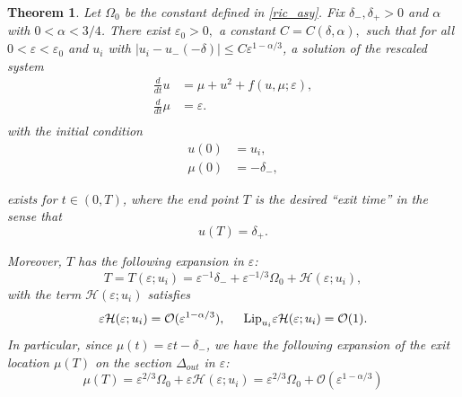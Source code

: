 \documentclass[letterpaper,11pt]{article}
\newcommand{\rmO}{\mathcal{O}}
\newcommand{\eps}{\varepsilon}
\numberwithin{equation}{section}
\theoremstyle{plain}
\newtheorem{theorem}{Theorem}[section]
\begin{document}
\begin{theorem}\label{thm:main}Let $\Omega_0$ be the constant defined in \eqref{ric_asy}.
Fix $\delta_-, \delta_+>0$ and $\alpha$ with $0<\alpha <3/4$. There exist $\eps_0>0,$ a constant $C=C(\delta,\alpha),$ such that for all $0<\eps<\eps_0$ and $u_i$ with $|u_i -u_-(-\delta) | \le C\eps^{1-\alpha/3}$, a solution of the rescaled system 
\begin{equation}\label{main_eqn}
\begin{split}
\frac{d}{dt}u &= \mu+u^2+ f(u,\mu;\eps), \\
\frac{d}{dt} \mu &= \eps.  \\
\end{split}
\end{equation}
with the initial condition
\begin{equation}\label{main_ic}
\begin{split}
u(0) &= u_i, \\
\mu(0) &= -\delta_-,
\end{split}
\end{equation}

exists for $t \in (0,T)$, where the end point $T$ is the desired ``exit time'' in the sense that 
\begin{equation}\label{exit_time_cond}
 u(T) = \delta_+.
\end{equation}

Moreover, $T$ has the following expansion in $\eps$:
\begin{equation}\label{T_exp_+}
T = T(\eps ; u_i) = \eps^{-1}\delta_- + \eps^{-1/3}\Omega_0 +  \mathcal{H}(\eps; u_i),
\end{equation}
with the term $\mathcal{H}(\eps;u_i)$ satisfies 
\begin{equation}\label{T_remainder_exp}
\eps\mathcal{H}(\eps;u_i) = \rmO(\eps^{1-\alpha/3}), \hspace{0.2in} \text{Lip}_{u_i}\eps\mathcal{H}(\eps;u_i) = \rmO(1).
\end{equation}
In particular, since $\mu(t) = \eps t -\delta_-$, we have the following expansion of the exit location $\mu(T)$ on the section $\Delta_{out}$ in $\eps$:
\begin{equation}\label{exit_loc_exp}
\mu(T) = \eps^{2/3}\Omega_0  + \eps\mathcal{H}(\eps; u_i) = \eps^{2/3}\Omega_0 + \rmO(\eps^{1-\alpha/3})
\end{equation}

\end{theorem}
\end{document}
